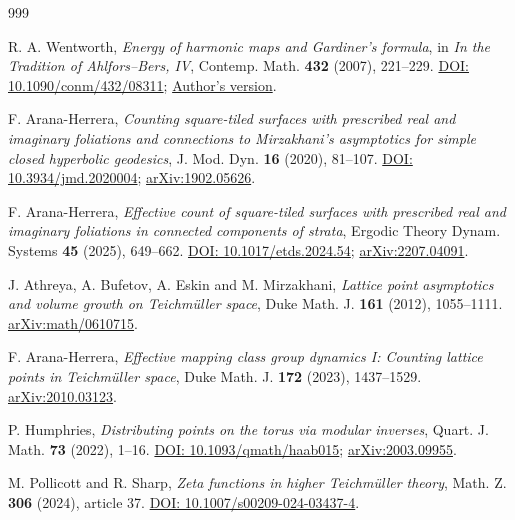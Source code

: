 \documentclass[11pt,a4paper]{article}
\numberwithin{equation}{section}
\theoremstyle{definition}
\theoremstyle{remark}
\begin{document}
\clearpage
\begin{thebibliography}{999}
\setlength{\itemsep}{0pt}
\setlength{\parskip}{0pt}

R. A. Wentworth,
\emph{Energy of harmonic maps and Gardiner's formula},
in \emph{In the Tradition of Ahlfors--Bers, IV},
Contemp. Math. \textbf{432} (2007), 221--229.
\href{https://doi.org/10.1090/conm/432/08311}{DOI: 10.1090/conm/432/08311};
\href{https://math.umd.edu/~raw/papers/gardiner.pdf}{Author's version}.

F. Arana-Herrera,
\emph{Counting square-tiled surfaces with prescribed real and imaginary
foliations and connections to Mirzakhani's asymptotics for simple
closed hyperbolic geodesics},
J. Mod. Dyn. \textbf{16} (2020), 81--107.
\href{https://doi.org/10.3934/jmd.2020004}{DOI: 10.3934/jmd.2020004};
\href{https://arxiv.org/abs/1902.05626}{arXiv:1902.05626}.

F. Arana-Herrera,
\emph{Effective count of square-tiled surfaces with prescribed real and
imaginary foliations in connected components of strata},
Ergodic Theory Dynam. Systems \textbf{45} (2025), 649--662.
\href{https://doi.org/10.1017/etds.2024.54}{DOI: 10.1017/etds.2024.54};
\href{https://arxiv.org/abs/2207.04091}{arXiv:2207.04091}.

J. Athreya, A. Bufetov, A. Eskin and M. Mirzakhani,
\emph{Lattice point asymptotics and volume growth on Teichm\"uller space},
Duke Math. J. \textbf{161} (2012), 1055--1111.
\href{https://arxiv.org/abs/math/0610715}{arXiv:math/0610715}.

F. Arana-Herrera,
\emph{Effective mapping class group dynamics I: Counting lattice points
in Teichm\"uller space},
Duke Math. J. \textbf{172} (2023), 1437--1529.
\href{https://arxiv.org/abs/2010.03123}{arXiv:2010.03123}.

P. Humphries,
\emph{Distributing points on the torus via modular inverses},
Quart. J. Math. \textbf{73} (2022), 1--16.
\href{https://doi.org/10.1093/qmath/haab015}{DOI: 10.1093/qmath/haab015};
\href{https://arxiv.org/abs/2003.09955}{arXiv:2003.09955}.

M. Pollicott and R. Sharp,
\emph{Zeta functions in higher Teichm\"uller theory},
Math. Z. \textbf{306} (2024), article 37.
\href{https://doi.org/10.1007/s00209-024-03437-4}{DOI: 10.1007/s00209-024-03437-4}.


\end{thebibliography}
\end{document}
